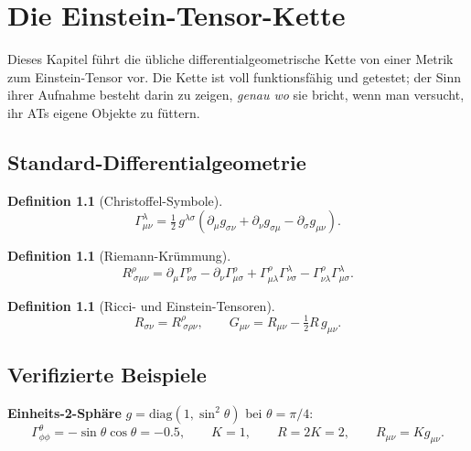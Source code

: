 \documentclass[10pt,twoside,openany]{book}
\newtheorem{definition}[theorem]{Definition}
\begin{document}
\chapter{Die Einstein-Tensor-Kette}
\label{ch:einstein-tensor}

Dieses Kapitel führt die übliche differentialgeometrische Kette von einer Metrik zum
Einstein-Tensor vor. Die Kette ist voll funktionsfähig und getestet; der Sinn ihrer
Aufnahme besteht darin zu zeigen, \emph{genau wo} sie bricht, wenn man versucht, ihr ATs
eigene Objekte zu füttern.

\section{Standard-Differentialgeometrie}

\begin{definition}[Christoffel-Symbole]
\begin{equation}
\Gamma^\lambda_{\mu\nu} = \tfrac12\, g^{\lambda\sigma}
\left( \partial_\mu g_{\sigma\nu} + \partial_\nu g_{\sigma\mu} - \partial_\sigma g_{\mu\nu} \right).
\end{equation}
\end{definition}

\begin{definition}[Riemann-Krümmung]
\begin{equation}
R^\rho_{\ \sigma\mu\nu} = \partial_\mu \Gamma^\rho_{\nu\sigma}
- \partial_\nu \Gamma^\rho_{\mu\sigma}
+ \Gamma^\rho_{\mu\lambda}\Gamma^\lambda_{\nu\sigma}
- \Gamma^\rho_{\nu\lambda}\Gamma^\lambda_{\mu\sigma}.
\end{equation}
\end{definition}

\begin{definition}[Ricci- und Einstein-Tensoren]
\begin{equation}
R_{\sigma\nu} = R^\rho_{\ \sigma\rho\nu}, \qquad
G_{\mu\nu} = R_{\mu\nu} - \tfrac12 R\, g_{\mu\nu}.
\end{equation}
\end{definition}

\section{Verifizierte Beispiele}

\textbf{Einheits-2-Sphäre} $g=\mathrm{diag}(1,\sin^2\theta)$ bei $\theta=\pi/4$:
\begin{equation}
\Gamma^\theta_{\phi\phi} = -\sin\theta\cos\theta = -0.5,
\qquad K = 1, \qquad R = 2K = 2, \qquad R_{\mu\nu}=K g_{\mu\nu}.
\end{equation}
\end{document}
